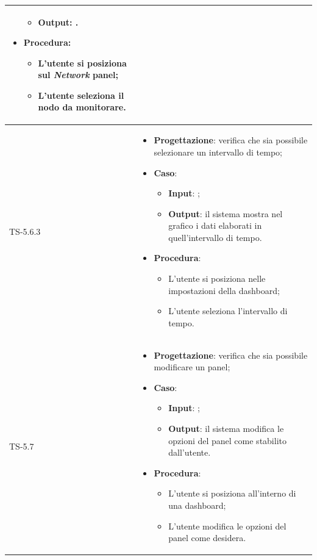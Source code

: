 \begin{longtable}{|C{2.5cm}|C{13cm}|}
\begin{itemize}
\begin{itemize}
		\item \textbf{Output}: .
	\end{itemize}
	\item \textbf{Procedura}:
	\begin{itemize}
		\item L'utente si posiziona sul \emph{Network} panel;
		\item L'utente seleziona il nodo da monitorare.
	\end{itemize} 
\end{itemize}
	 \\
	\hline
	{TS-5.6.3} & 
\begin{itemize}
	\item \textbf{Progettazione}: verifica che sia possibile selezionare un
	intervallo di tempo;
	\item \textbf{Caso}: 
	\begin{itemize}
		\item \textbf{Input}: ;
		\item \textbf{Output}: il sistema mostra nel grafico i dati elaborati in quell'intervallo di tempo.
	\end{itemize}
	\item \textbf{Procedura}:
	\begin{itemize}
		\item L'utente si posiziona nelle impostazioni della dashboard;
		\item L'utente seleziona l'intervallo di tempo.
	\end{itemize} 
\end{itemize}
	 \\
	\hline
	{TS-5.7} & 
\begin{itemize}
	\item \textbf{Progettazione}: verifica che sia possibile modificare un
	panel;
	\item \textbf{Caso}: 
	\begin{itemize}
		\item \textbf{Input}: ;
		\item \textbf{Output}: il sistema modifica le opzioni del panel come stabilito dall'utente.
	\end{itemize}
	\item \textbf{Procedura}:
	\begin{itemize}
		\item L'utente si posiziona all'interno di una dashboard;
		\item L'utente modifica le opzioni del panel come desidera.
	\end{itemize} 

\end{itemize}
\end{longtable}
